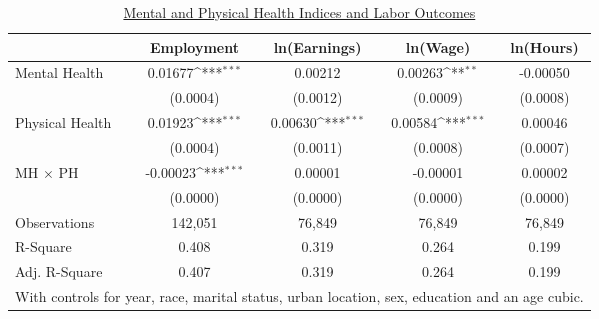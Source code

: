 \documentclass[border=3mm,preview]{standalone}
\begin{document}
\begin{landscape}
\def\sym#1{\ifmmode^{#1}\else\(^{#1}\)\fi}
\begin{table}
\center\caption*{\large{\underline{Mental and Physical Health Indices and Labor Outcomes}}}
\vspace{0.2cm}
\begin{tabular}{l*{4}{c}}
                    &\multicolumn{1}{c}{Employment}&\multicolumn{1}{c}{ln(Earnings)}&\multicolumn{1}{c}{ln(Wage)}&\multicolumn{1}{c}{ln(Hours)}\\
\midrule
Mental Health       &     0.01677\sym{***}&     0.00212         &     0.00263\sym{**} &    -0.00050         \\
                    &    (0.0004)         &    (0.0012)         &    (0.0009)         &    (0.0008)         \\
Physical Health     &     0.01923\sym{***}&     0.00630\sym{***}&     0.00584\sym{***}&     0.00046         \\
                    &    (0.0004)         &    (0.0011)         &    (0.0008)         &    (0.0007)         \\
MH $\times$ PH      &    -0.00023\sym{***}&     0.00001         &    -0.00001         &     0.00002         \\
                    &    (0.0000)         &    (0.0000)         &    (0.0000)         &    (0.0000)         \\
\midrule
Observations        &      142,051         &       76,849         &       76,849         &       76,849         \\
R-Square            &       0.408         &       0.319         &       0.264         &       0.199         \\
Adj. R-Square       &       0.407         &       0.319         &       0.264         &       0.199         \\
\bottomrule
\multicolumn{5}{l}{\scriptsize{With controls for year, race, marital status, urban location, sex, education and an age cubic.}} \\
\end{tabular}
\end{table}
\end{landscape}
\end{document}
